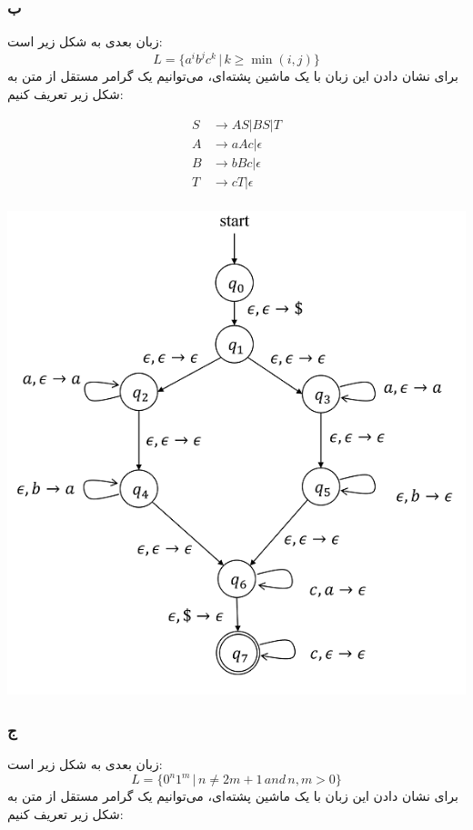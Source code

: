 \subsubsection*{ب}
زبان بعدی به شکل زیر است:
\[L = \{a^i b^j c^k \,|\, k \geq \min(i, j)\}\]
برای نشان دادن این زبان با یک ماشین پشته‌ای، می‌توانیم یک گرامر مستقل از متن به شکل زیر تعریف کنیم:

\begin{align*}
	S &\to AS | BS | T \\
	A &\to aAc | \epsilon \\
	B &\to bBc | \epsilon \\
	T &\to cT | \epsilon \\
\end{align*}

\begin{center}
	\includegraphics{image4}
\end{center}

\subsubsection*{ج}
زبان بعدی به شکل زیر است:
\[L = \{0^n 1^m \,|\, n \ne 2m + 1 \,and\, n,m > 0\}\]
برای نشان دادن این زبان با یک ماشین پشته‌ای، می‌توانیم یک گرامر مستقل از متن به شکل زیر تعریف کنیم:

